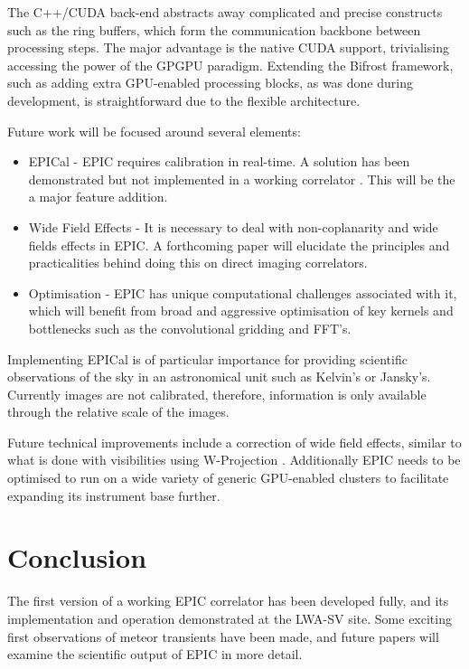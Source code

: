 \documentclass[bibliography=totocnumbered, twocolumn]{article}
\begin{document}
The C++/CUDA back-end abstracts away complicated and precise constructs
such as the ring buffers, which form the communication backbone between
processing steps. The major advantage is the native CUDA support,
trivialising accessing the power of the GPGPU paradigm. Extending the 
Bifrost framework, such as adding extra GPU-enabled processing blocks, as
was done during development, is straightforward due to the flexible
architecture.

Future work will be focused around several elements:

\begin{itemize}
\item EPICal - EPIC requires calibration in real-time. A solution has been demonstrated but not implemented in a working correlator \cite{beardsley_efficient_2017}. This will be the a major feature addition.
\item Wide Field Effects - It is necessary to deal with non-coplanarity and wide fields effects in EPIC. A forthcoming paper will elucidate the principles and practicalities behind doing this on direct imaging correlators.
\item Optimisation - EPIC has unique computational challenges associated with it, which will benefit from broad and aggressive optimisation of key kernels and bottlenecks such as the convolutional gridding and FFT's.
\end{itemize}

Implementing EPICal is of particular importance for providing scientific
observations of the sky in an astronomical unit such as Kelvin's
or Jansky's. Currently images are not calibrated, therefore, information
is only available through the relative scale of the images.

Future technical improvements include a correction of wide field
effects, similar to what is done with visibilities using W-Projection \cite{cornwell_noncoplanar_2008}.
Additionally EPIC needs to be optimised to run on a wide variety of generic
GPU-enabled clusters to facilitate expanding its instrument base further.

\section{Conclusion}

The first version of a working EPIC correlator has been developed
fully, and its implementation and operation demonstrated at the
LWA-SV site. Some exciting first observations of meteor transients
have been made, and future papers will examine the scientific
output of EPIC in more detail.
\end{document}
